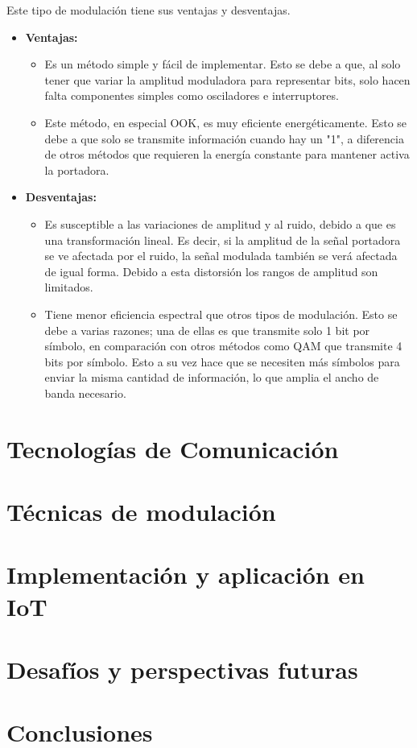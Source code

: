 \documentclass[12pt, letterpaper]{article}
\begin{document}
\newpage
Este tipo de modulación tiene sus ventajas y desventajas.
\begin{itemize}
    \item \textbf{Ventajas:}
    \begin{itemize}
        \item Es un método simple y fácil de implementar. Esto se debe a que, al solo tener que variar la amplitud moduladora para representar bits, solo hacen falta componentes simples como osciladores e interruptores. 
        \item Este método, en especial OOK, es muy eficiente  energéticamente. Esto se debe a que solo se transmite información cuando hay un "1", a diferencia de otros métodos que requieren la energía constante para mantener activa la portadora.
    \end{itemize}

    \item \textbf{Desventajas:}
    \begin{itemize}
        \item Es susceptible a las variaciones de amplitud y al ruido, debido a que es una transformación lineal. Es decir, si la amplitud de la señal portadora se ve afectada por el ruido, la señal modulada también se verá afectada de igual forma. Debido a esta distorsión los rangos de amplitud son limitados.
        \item Tiene menor eficiencia espectral que otros tipos de modulación. Esto se debe a varias razones; una de ellas es que transmite solo 1 bit por símbolo, en comparación con otros métodos como QAM que transmite 4 bits por símbolo. Esto a su vez hace que se necesiten más símbolos para enviar la misma cantidad de información, lo que amplia el ancho de banda necesario.
    \end{itemize}
\end{itemize}

\newpage
\section{Tecnologías de Comunicación}

\newpage
\section{Técnicas de modulación}

\newpage
\section{Implementación y aplicación en IoT}

\newpage
\section{Desafíos y perspectivas futuras}

\newpage
\section{Conclusiones}
\end{document}
